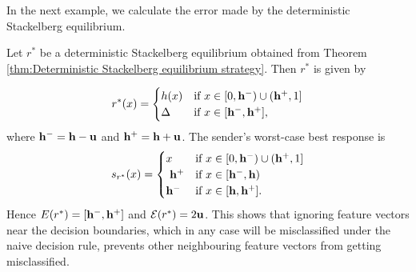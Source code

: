 In the next example, we calculate the error made by the deterministic Stackelberg equilibrium.
\begin{exg}	Let $r^*$ be a deterministic Stackelberg equilibrium obtained from Theorem \ref{thm:Deterministic Stackelberg equilibrium strategy}. Then $r^*$ is given by

	\begin{equation*}
		\begin{aligned}
			r^*(x) = \begin{cases}
				h(x) & \text{if } x \in [0,\mathbf{h^{-}}) \cup (\mathbf{h^{+}},1]\\
				\Delta & \text{if } x \in [\mathbf{h^{-}},\mathbf{h^{+}}],
			\end{cases}
		\end{aligned}
	\end{equation*}
	where $\mathbf{h^{-}} = \mathbf{h} - \mathbf{u}$ and $\mathbf{h^{+}} = \mathbf{h} + \mathbf{u}$. The sender's worst-case best response is
	\begin{equation*}
		\begin{aligned}
			s_{r^*}(x) = \begin{cases}
				x & \text{if } x \in [0,\mathbf{h^{-}}) \cup (\mathbf{h^{+}},1]\\\
				\mathbf{h^{+}} & \text{if } x \in [\mathbf{h^{-}},\mathbf{h}) \\
				\mathbf{h^{-}} & \text{if } x \in [\mathbf{h},\mathbf{h^{+}}].
			\end{cases}
		\end{aligned}
	\end{equation*}
Hence $E(r^*) = [\mathbf{h^{-}},\mathbf{h^{+}}]$ and $\mathcal{E}(r^*) = 2\mathbf{u}$. This shows that ignoring feature vectors near the decision boundaries, which in any case will be misclassified under the naive decision rule, prevents other neighbouring feature vectors from getting misclassified.
	\begin{figure}
		\centering
\end{figure}
\end{exg}
